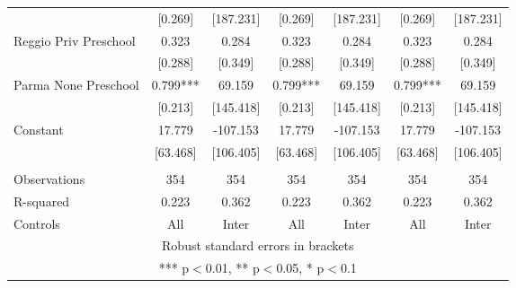 \begin{tabular}{lcccccc}
 & [0.269] & [187.231] & [0.269] & [187.231] & [0.269] & [187.231] \\
Reggio Priv Preschool & 0.323 & 0.284 & 0.323 & 0.284 & 0.323 & 0.284 \\
 & [0.288] & [0.349] & [0.288] & [0.349] & [0.288] & [0.349] \\
Parma None Preschool & 0.799*** & 69.159 & 0.799*** & 69.159 & 0.799*** & 69.159 \\
 & [0.213] & [145.418] & [0.213] & [145.418] & [0.213] & [145.418] \\
Constant & 17.779 & -107.153 & 17.779 & -107.153 & 17.779 & -107.153 \\
 & [63.468] & [106.405] & [63.468] & [106.405] & [63.468] & [106.405] \\
 &  &  &  &  &  &  \\
Observations & 354 & 354 & 354 & 354 & 354 & 354 \\
R-squared & 0.223 & 0.362 & 0.223 & 0.362 & 0.223 & 0.362 \\
 Controls & All & Inter & All & Inter & All & Inter \\ \hline
\multicolumn{7}{c}{ Robust standard errors in brackets} \\
\multicolumn{7}{c}{ *** p$<$0.01, ** p$<$0.05, * p$<$0.1} \\
\end{tabular}
